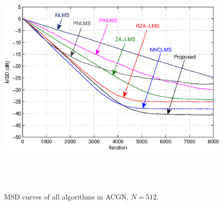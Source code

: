 \begin{figure}[!htb]
\begin{center}
\vspace{1cm}
\includegraphics[width=14.25cm, height=11cm]{Figures/Chapter5/fig7.eps}\\
\end{center}
\vspace{-1cm}
\caption{MSD curves of all algorithms in ACGN, $N=512$.}
\label{fig7}
\vspace{1.5cm}
\end{figure}

